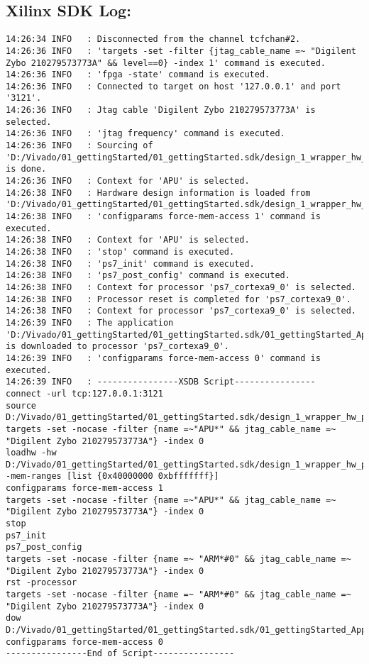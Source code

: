 \subsection{Xilinx SDK Log:}
\label{anhang:SDKLog}
\lstset{language=plain}
\begin{lstlisting}
14:26:34 INFO	: Disconnected from the channel tcfchan#2.
14:26:36 INFO	: 'targets -set -filter {jtag_cable_name =~ "Digilent Zybo 210279573773A" && level==0} -index 1' command is executed.
14:26:36 INFO	: 'fpga -state' command is executed.
14:26:36 INFO	: Connected to target on host '127.0.0.1' and port '3121'.
14:26:36 INFO	: Jtag cable 'Digilent Zybo 210279573773A' is selected.
14:26:36 INFO	: 'jtag frequency' command is executed.
14:26:36 INFO	: Sourcing of 'D:/Vivado/01_gettingStarted/01_gettingStarted.sdk/design_1_wrapper_hw_platform_0/ps7_init.tcl' is done.
14:26:36 INFO	: Context for 'APU' is selected.
14:26:38 INFO	: Hardware design information is loaded from 'D:/Vivado/01_gettingStarted/01_gettingStarted.sdk/design_1_wrapper_hw_platform_0/system.hdf'.
14:26:38 INFO	: 'configparams force-mem-access 1' command is executed.
14:26:38 INFO	: Context for 'APU' is selected.
14:26:38 INFO	: 'stop' command is executed.
14:26:38 INFO	: 'ps7_init' command is executed.
14:26:38 INFO	: 'ps7_post_config' command is executed.
14:26:38 INFO	: Context for processor 'ps7_cortexa9_0' is selected.
14:26:38 INFO	: Processor reset is completed for 'ps7_cortexa9_0'.
14:26:38 INFO	: Context for processor 'ps7_cortexa9_0' is selected.
14:26:39 INFO	: The application 'D:/Vivado/01_gettingStarted/01_gettingStarted.sdk/01_gettingStarted_ApplicationProject/Debug/01_gettingStarted_ApplicationProject.elf' is downloaded to processor 'ps7_cortexa9_0'.
14:26:39 INFO	: 'configparams force-mem-access 0' command is executed.
14:26:39 INFO	: ----------------XSDB Script----------------
connect -url tcp:127.0.0.1:3121
source D:/Vivado/01_gettingStarted/01_gettingStarted.sdk/design_1_wrapper_hw_platform_0/ps7_init.tcl
targets -set -nocase -filter {name =~"APU*" && jtag_cable_name =~ "Digilent Zybo 210279573773A"} -index 0
loadhw -hw D:/Vivado/01_gettingStarted/01_gettingStarted.sdk/design_1_wrapper_hw_platform_0/system.hdf -mem-ranges [list {0x40000000 0xbfffffff}]
configparams force-mem-access 1
targets -set -nocase -filter {name =~"APU*" && jtag_cable_name =~ "Digilent Zybo 210279573773A"} -index 0
stop
ps7_init
ps7_post_config
targets -set -nocase -filter {name =~ "ARM*#0" && jtag_cable_name =~ "Digilent Zybo 210279573773A"} -index 0
rst -processor
targets -set -nocase -filter {name =~ "ARM*#0" && jtag_cable_name =~ "Digilent Zybo 210279573773A"} -index 0
dow D:/Vivado/01_gettingStarted/01_gettingStarted.sdk/01_gettingStarted_ApplicationProject/Debug/01_gettingStarted_ApplicationProject.elf
configparams force-mem-access 0
----------------End of Script----------------


\end{lstlisting}
